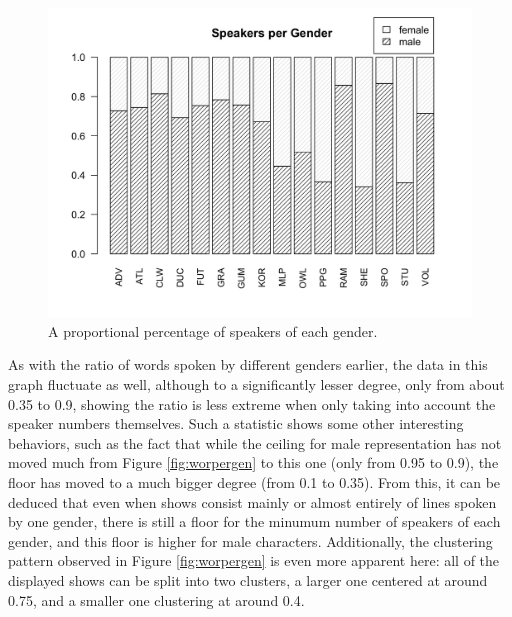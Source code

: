 \documentclass[a4paper, 11pt]{article}
\begin{document}
\begin{figure}[t!]
  \includegraphics[width=\linewidth]{figures/spkpergen.png}
  \caption{A proportional percentage of speakers of each gender.}
  \label{fig:spkpergen}
\end{figure}

As with the ratio of words spoken by different genders earlier, the data in this graph fluctuate as well, although to a significantly lesser degree, only from about 0.35 to 0.9, showing the ratio is less extreme when only taking into account the speaker numbers themselves. Such a statistic shows some other interesting behaviors, such as the fact that while the ceiling for male representation has not moved much from Figure \ref{fig:worpergen} to this one (only from 0.95 to 0.9), the floor has moved to a much bigger degree (from 0.1 to 0.35). From this, it can be deduced that even when shows consist mainly or almost entirely of lines spoken by one gender, there is still a floor for the minumum number of speakers of each gender, and this floor is higher for male characters. Additionally, the clustering pattern observed in Figure \ref{fig:worpergen} is even more apparent here: all of the displayed shows can be split into two clusters, a larger one centered at around 0.75, and a smaller one clustering at around 0.4. 
\end{document}
